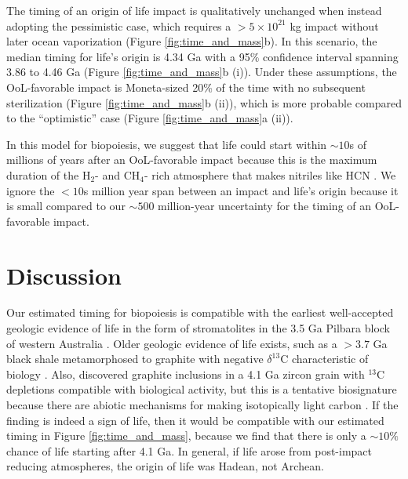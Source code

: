 \documentclass{Liebert_Author}
\begin{document}
The timing of an origin of life impact is qualitatively unchanged when instead adopting the \citet{Wogan_2023} pessimistic case, which requires a $> 5 \times 10^{21}$ kg impact without later ocean vaporization (Figure \ref{fig:time_and_mass}b). In this scenario, the median timing for life's origin is 4.34 Ga with a 95\% confidence interval spanning 3.86 to 4.46 Ga (Figure \ref{fig:time_and_mass}b (i)). Under these assumptions, the OoL-favorable impact is Moneta-sized 20\% of the time with no subsequent sterilization (Figure \ref{fig:time_and_mass}b (ii)), which is more probable compared to the ``optimistic'' case (Figure \ref{fig:time_and_mass}a (ii)).

In this model for biopoiesis, we suggest that life could start within $\sim 10$s of millions of years after an OoL-favorable impact because this is the maximum duration of the H$_2$- and CH$_4$- rich atmosphere that makes nitriles like HCN \citep{Wogan_2023}. We ignore the $< 10$s million year span between an impact and life's origin because it is small compared to our $\sim 500$ million-year uncertainty for the timing of an OoL-favorable impact.

\section{Discussion}

Our estimated timing for biopoiesis is compatible with the earliest well-accepted geologic evidence of life in the form of stromatolites in the 3.5 Ga Pilbara block of western Australia \citep{Walter_1980,Buick_1981,Van_2018}. Older geologic evidence of life exists, such as a $> 3.7$ Ga black shale metamorphosed to graphite with negative $\delta^{13}$C characteristic of biology \citep{Rosing_1999,Ohtomo_2014}. Also, \citet{Bell_2015} discovered graphite inclusions in a 4.1 Ga zircon grain with $^{13}$C depletions compatible with biological activity, but this is a tentative biosignature because there are abiotic mechanisms for making isotopically light carbon \citep{Javaux_2019}. If the \citet{Bell_2015} finding is indeed a sign of life, then it would be compatible with our estimated timing in Figure \ref{fig:time_and_mass}, because we find that there is only a $\sim 10\%$ chance of life starting after 4.1 Ga. In general, if life arose from post-impact reducing atmospheres, the origin of life was Hadean, not Archean.
\end{document}
